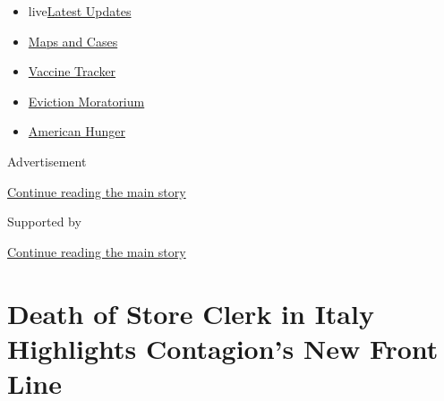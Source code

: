 \begin{itemize}
\tightlist
\item
  live\href{https://www.nytimes3xbfgragh.onion/2020/09/05/world/coronavirus-covid.html?name=styln-coronavirus-national\&region=TOP_BANNER\&block=storyline_menu_recirc\&action=click\&pgtype=Article\&impression_id=5bb89e11-efbb-11ea-88d9-652181eb49b5\&variant=undefined}{Latest
  Updates}
\item
  \href{https://www.nytimes3xbfgragh.onion/interactive/2020/us/coronavirus-us-cases.html?name=styln-coronavirus-national\&region=TOP_BANNER\&block=storyline_menu_recirc\&action=click\&pgtype=Article\&impression_id=5bb89e12-efbb-11ea-88d9-652181eb49b5\&variant=undefined}{Maps
  and Cases}
\item
  \href{https://www.nytimes3xbfgragh.onion/interactive/2020/science/coronavirus-vaccine-tracker.html?name=styln-coronavirus-national\&region=TOP_BANNER\&block=storyline_menu_recirc\&action=click\&pgtype=Article\&impression_id=5bb89e13-efbb-11ea-88d9-652181eb49b5\&variant=undefined}{Vaccine
  Tracker}
\item
  \href{https://www.nytimes3xbfgragh.onion/2020/09/02/your-money/eviction-moratorium-covid.html?name=styln-coronavirus-national\&region=TOP_BANNER\&block=storyline_menu_recirc\&action=click\&pgtype=Article\&impression_id=5bb89e14-efbb-11ea-88d9-652181eb49b5\&variant=undefined}{Eviction
  Moratorium}
\item
  \href{https://www.nytimes3xbfgragh.onion/interactive/2020/09/02/magazine/food-insecurity-hunger-us.html?name=styln-coronavirus-national\&region=TOP_BANNER\&block=storyline_menu_recirc\&action=click\&pgtype=Article\&impression_id=5bb89e15-efbb-11ea-88d9-652181eb49b5\&variant=undefined}{American
  Hunger}
\end{itemize}

Advertisement

\protect\hyperlink{after-top}{Continue reading the main story}

Supported by

\protect\hyperlink{after-sponsor}{Continue reading the main story}

\hypertarget{death-of-store-clerk-in-italy-highlights-contagions-new-front-line}{%
\section{Death of Store Clerk in Italy Highlights Contagion's New Front
Line}\label{death-of-store-clerk-in-italy-highlights-contagions-new-front-line}}

